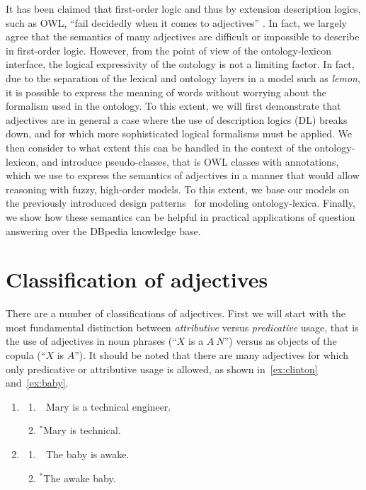 \documentclass[11pt]{article}
\begin{document}
It has been claimed that first-order logic and thus by extension description 
logics, such as OWL, ``fail decidedly when it comes to adjectives''
\cite{bankston2003modeling}. In fact, we largely agree that the semantics 
of many adjectives are difficult or impossible to describe in first-order logic. 
However, from the point of view of the ontology-lexicon interface, the logical 
expressivity of the ontology is not a limiting factor. In fact, due to the 
separation of the lexical and ontology layers in a model such as \emph{lemon}, 
it is possible to express the meaning of words without worrying about the 
formalism used in the ontology. To this extent, we will first demonstrate that 
adjectives are in general a case where the use of description logics (DL) breaks down, 
and for which more sophisticated logical formalisms must be applied. We then 
consider to what extent this can be handled in the context of the 
ontology-lexicon, and introduce pseudo-classes, that is OWL classes with 
annotations, which we use to express the semantics of adjectives in a manner
that would allow reasoning with fuzzy, high-order models. To this extent, we base
our models on the previously introduced design patterns~\cite{mccrae2014design}
for modeling ontology-lexica. 
Finally, we show how these semantics can be helpful in practical applications 
of question answering over the DBpedia knowledge base.

\section{Classification of adjectives}

There are a number of classifications of adjectives. First we will start 
with the most fundamental distinction between \emph{attributive} versus 
\emph{predicative} usage, that is the use of adjectives in noun phrases 
(``$X$ is a $A~N$'') versus as objects of the copula (``$X$ is $A$''). 
It should be noted that there are many adjectives for which only predicative or 
attributive usage is allowed, as shown in~\ref{ex:clinton} and~\ref{ex:baby}.

\begin{enumerate}[resume]
\item \begin{enumerate}	
\item \ \,Mary is a technical engineer. \label{ex:engineer}
\item $^\ast$Mary is technical.
\end{enumerate}
\label{ex:technical}
\item \begin{enumerate}	
\item \ \,The baby is awake.
\item $^\ast$The awake baby.
\end{enumerate}
\label{ex:baby}
\end{enumerate}
\end{document}
